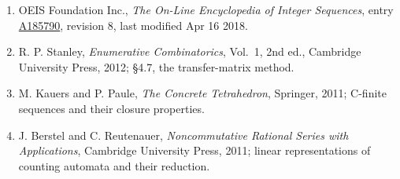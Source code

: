 \documentclass[11pt]{article}
\theoremstyle{definition}
\begin{document}
\begin{enumerate}

\item OEIS Foundation Inc., \emph{The On-Line Encyclopedia of Integer Sequences}, entry \href{https://oeis.org/A185790}{A185790}, revision 8, last modified Apr 16 2018.

\item R. P. Stanley, \emph{Enumerative Combinatorics}, Vol.~1, 2nd ed., Cambridge University Press, 2012; \S4.7, the transfer-matrix method.

\item M. Kauers and P. Paule, \emph{The Concrete Tetrahedron}, Springer, 2011; C-finite sequences and their closure properties.

\item J. Berstel and C. Reutenauer, \emph{Noncommutative Rational Series with Applications}, Cambridge University Press, 2011; linear representations of counting automata and their reduction.

\end{enumerate}
\end{document}
